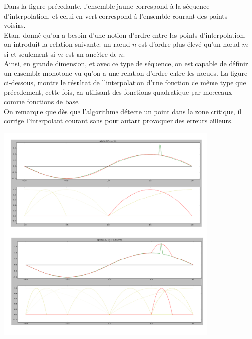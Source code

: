 Dans la figure précedante, l'ensemble jaune correspond à la séquence d'interpolation, et celui en vert correspond à l'ensemble courant des points voisins.\\
Etant donné qu'on a besoin d'une notion d'ordre entre les points d'interpolation, on introduit la relation suivante: un nœud $n$ est d'ordre plus élevé qu'un nœud $m$ si et seulement si $m$ est un ancêtre de $n$.\\
Ainsi, en grande dimension, et avec ce type de séquence, on est capable de définir un ensemble monotone vu qu'on a une relation d'ordre entre les nœuds.
La figure ci-dessous, montre le résultat de l'interpolation d'une fonction de même type que précedement, cette fois, en utilisant des fonctions quadratique par morceaux comme fonctions de base.\\
On remarque que dès que l'algorithme détecte un point dans la zone critique, il corrige l'interpolant courant sans pour autant provoquer des erreurs ailleurs.\\
\begin{center}
\includegraphics[height= 11cm,width = 11cm]{images/interp_pm.png}
\end{center}

